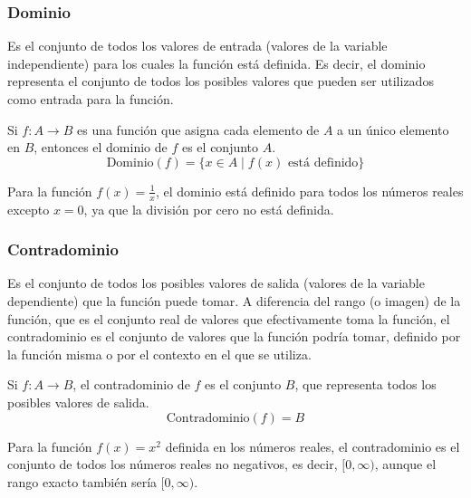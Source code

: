 \subsubsection{Dominio}

\begin{definition}[Dominio]
    Es el conjunto de todos los valores de entrada (valores de la variable independiente) para los cuales la función está definida. Es decir, el dominio representa el conjunto de todos los posibles valores que pueden ser utilizados como entrada para la función.

Si \( f: A \to B \) es una función que asigna cada elemento de \( A \) a un único elemento en \( B \), entonces el dominio de \( f \) es el conjunto \( A \).
\begin{equation}
    \text{Dominio}(f) = \{ x \in A \mid f(x) \text{ está definido} \}
\end{equation}
\end{definition}
\begin{example}
    Para la función \( f(x) = \frac{1}{x} \), el dominio está definido para todos los números reales excepto \( x = 0 \), ya que la división por cero no está definida.
\end{example}
\subsubsection{Contradominio}
\begin{definition}
    Es el conjunto de todos los posibles valores de salida (valores de la variable dependiente) que la función puede tomar. A diferencia del rango (o imagen) de la función, que es el conjunto real de valores que efectivamente toma la función, el contradominio es el conjunto de valores que la función podría tomar, definido por la función misma o por el contexto en el que se utiliza.

Si \( f: A \to B \), el contradominio de \( f \) es el conjunto \( B \), que representa todos los posibles valores de salida.
\begin{equation}
    \text{Contradominio}(f) = B
\end{equation}
\end{definition}
\begin{example}
    Para la función \( f(x) = x^2 \) definida en los números reales, el contradominio es el conjunto de todos los números reales no negativos, es decir, \( [0, \infty) \), aunque el rango exacto también sería \( [0, \infty) \).
\end{example}

